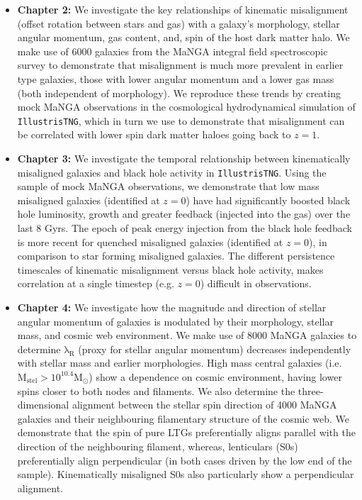 \begin{itemize}
    \item \textbf{Chapter 2:} We investigate the key relationships of kinematic misalignment (offset rotation between stars and gas) with a galaxy's morphology, stellar angular momentum, gas content, and, spin of the host dark matter halo. We make use of 6000 galaxies from the MaNGA integral field spectroscopic survey to demonstrate that misalignment is much more prevalent in earlier type galaxies, those with lower angular momentum and a lower gas mass (both independent of morphology). We reproduce these trends by creating mock MaNGA observations in the cosmological hydrodynamical simulation of \texttt{IllustrisTNG}, which in turn we use to demonstrate that misalignment can be correlated with lower spin dark matter haloes going back to $z=1$.
    
    \item \textbf{Chapter 3:} We investigate the temporal relationship between kinematically misaligned galaxies and black hole activity in \texttt{IllustrisTNG}. Using the sample of mock MaNGA observations, we demonstrate that low mass misaligned galaxies (identified at $z=0$) have had significantly boosted black hole luminosity, growth and greater feedback (injected into the gas) over the last 8 Gyrs. The epoch of peak energy injection from the black hole feedback is more recent for quenched misaligned galaxies (identified at $z=0$), in comparison to star forming misaligned galaxies. The different persistence timescales of kinematic misalignment versus black hole activity, makes correlation at a single timestep (e.g. $z=0$) difficult in observations.
    
    \item \textbf{Chapter 4:} We investigate how the magnitude and direction of stellar angular momentum of galaxies is modulated by their morphology, stellar mass, and cosmic web environment. We make use of 8000 MaNGA galaxies to determine $\mathrm{\lambda_R}$ (proxy for stellar angular momentum) decreases independently with stellar mass and earlier morphologies. High mass central galaxies (i.e. $\mathrm{M_{stel} > 10^{10.4}M_{\odot}}$) show a dependence on cosmic environment, having lower spins closer to both nodes and filaments. We also determine the three-dimensional alignment between the stellar spin direction of 4000 MaNGA galaxies and their neighbouring filamentary structure of the cosmic web. We demonstrate that the spin of pure LTGs preferentially aligns parallel with the direction of the neighbouring filament, whereas, lenticulars (S0s) preferentially align perpendicular (in both cases driven by the low end of the sample). Kinematically misaligned S0s also particularly show a perpendicular alignment.
    

\end{itemize}
